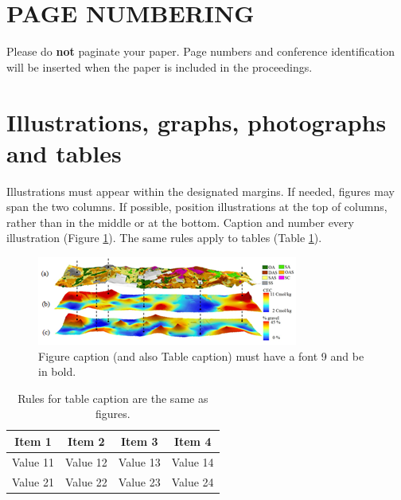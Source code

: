 \section{PAGE NUMBERING}
    
Please do \textbf{not} paginate your paper. Page numbers and conference identification will be inserted when the paper is included in the proceedings.
\pagebreak
	
\section{Illustrations, graphs, photographs and tables}
	
Illustrations must appear within the designated margins. If needed, figures may span the two columns. If possible, position illustrations at the top of columns, rather than in the middle or at the bottom. Caption and number every illustration (Figure \ref{example_figure}). The same rules apply to tables (Table \ref{example_table}). 
	
\begin{figure}[h] %
    \begin{center}
    \includegraphics[width=\linewidth]{figures/example_figure.png}
    \caption{Figure caption (and also Table caption) must have a font 9 and be in bold.}
    \label{example_figure}
    \end{center}
\end{figure}

\begin{table}[h] %
    \centering
    \begin{tabular}{|c|c|c|c|}
        \hline
        \textbf{Item 1} & \textbf{Item 2} & \textbf{Item 3} & \textbf{Item 4}  \\
        \hline
        Value 11 & Value 12 & Value 13 & Value 14  \\
        \hline
        Value 21 & Value 22 & Value 23 & Value 24  \\
        \hline
    \end{tabular}
    \caption{Rules for table caption are the same as figures.}
    \label{example_table}
\end{table}
